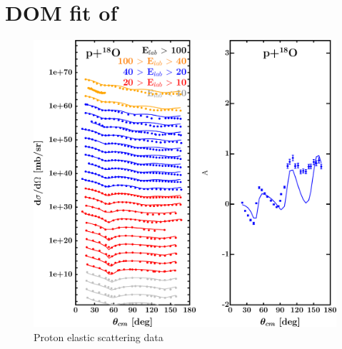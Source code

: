 \section{DOM fit of \oEight}
\label{o18DOMOutput}
\begin{figure}[H]
    \centering
    \begin{minipage}{0.45\textwidth}
        \centering
        \includegraphics[width=1.0\textwidth]{figures/o18_protonElastic.png}
        \caption{Proton elastic scattering data}
        \label{DOMFitData_o18_proton_elastic}
    \end{minipage}\hfill
    \begin{minipage}{0.45\textwidth}
        \centering

\end{minipage}
\end{figure}
